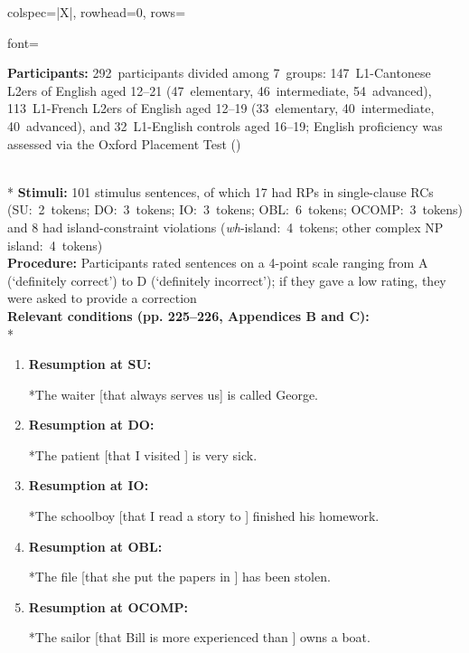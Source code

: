 \begin{longtblr}[caption={\textcite{hawkins.chan1997}: Acceptability judgment task}, label={tblr:hawkins}]{colspec={|X|}, rowhead=0, rows={font=\raggedright{}}}\hline
\textbf{Participants:} 292~participants divided among 7~groups: 147~L1-Cantonese L2ers of English aged 12--21 (47~elementary, 46~intermediate, 54~advanced), 113~L1-French L2ers of English aged 12--19 (33~elementary, 40~intermediate, 40~advanced), and 32~L1-English controls aged 16--19; English proficiency was assessed via the Oxford Placement Test (\cite{allan1992}) \vspace{5pt}\rule{0pt}{10pt}\\*
\textbf{Stimuli:} 101 stimulus sentences, of which 17 had RPs in single-clause RCs (SU:~2~tokens; DO:~3~tokens; IO:~3~tokens; OBL:~6~tokens; OCOMP:~3~tokens) and 8 had island-constraint violations (\textit{wh}-island:~4~tokens; other complex NP island:~4~tokens) \vspace{5pt}\\
\textbf{Procedure:} Participants rated sentences on a 4-point scale ranging from A (`definitely correct') to D (`definitely incorrect'); if they gave a low rating, they were asked to provide a correction \vspace{5pt}\\
\textbf{Relevant conditions (pp. 225--226, Appendices B and C):} \vspace{5pt}\\*
\begin{varwidth}{\linewidth}\begin{enumerate}[\bfseries (a),itemsep=5pt] 
\item \textbf{Resumption at SU:}\par\nobreak
*The waiter [that  always serves us] is called George.
\item \textbf{Resumption at DO:}\par\nobreak
*The patient [that I visited ] is very sick.
\item \textbf{Resumption at IO:}\par\nobreak
*The schoolboy [that I read a story to ] finished his homework.
\item \textbf{Resumption at OBL:}\par\nobreak
*The file [that she put the papers in ] has been stolen.
\item \textbf{Resumption at OCOMP:}\par\nobreak
*The sailor [that Bill is more experienced than ] owns a boat.

\end{enumerate}
\end{varwidth}
\end{longtblr}
